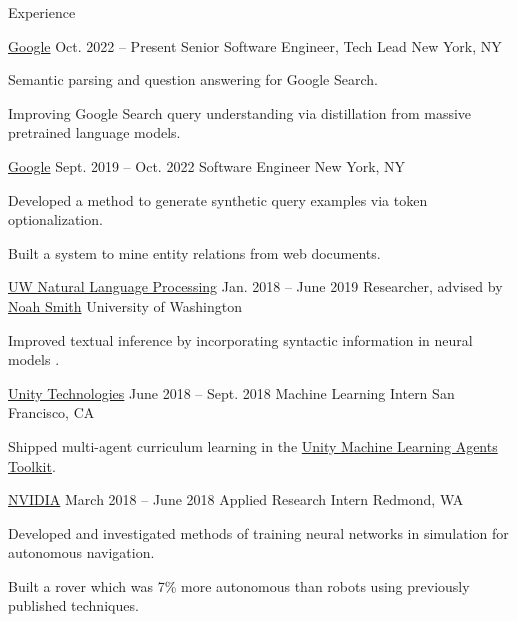 \documentclass{resume}
\begin{document}
\begin{rSection}{Experience}
  \begin{rSubsection}{\href{https://careers.google.com/locations/mountain-view/}
                           {Google}}
                     {Oct. 2022 -- Present}
                     {Senior Software Engineer, Tech Lead}
                     {New York, NY}
    \item Semantic parsing and question answering for Google Search.
    \item Improving Google Search query understanding via distillation from massive pretrained language models.
  \end{rSubsection}
  
  \begin{rSubsection}{\href{https://careers.google.com/locations/mountain-view/}
                           {Google}}
                     {Sept. 2019 -- Oct. 2022}
                     {Software Engineer}
                     {New York, NY}
    \item Developed a method to generate synthetic query examples via token optionalization.
    \item Built a system to mine entity relations from web documents.
  \end{rSubsection}

  \begin{rSubsection}{\href{https://nlp.washington.edu/}
                           {UW Natural Language Processing}}
                     {Jan. 2018 -- June 2019}
                     {Researcher, advised by
                       \href{https://homes.cs.washington.edu/~nasmith/}
                            {Noah Smith}}
                     {University of Washington}
    \item Improved textual inference by incorporating syntactic
      information in neural models \citep{pang2019improving}.
  \end{rSubsection}

  \begin{rSubsection}{{\href{https://unity.com/}{Unity Technologies}}}
                      {June 2018 -- Sept. 2018}
                      {Machine Learning Intern}
                      {San Francisco, CA}
    \item Shipped multi-agent curriculum learning in the
      \href{https://unity.com/products/machine-learning-agents}
           {Unity Machine Learning Agents Toolkit}.
  \end{rSubsection}

  \begin{rSubsection}{{\href{http://www.nvidia.com/page/home.html}{NVIDIA}}}
                      {March 2018 -- June 2018}
                      {Applied Research Intern}
                      {Redmond, WA}
    \item Developed and investigated methods of training neural networks in
      simulation for autonomous navigation.
    \item Built a rover which was 7\% more autonomous than robots using
      previously published techniques.
  \end{rSubsection}


\end{rSection}
\end{document}
